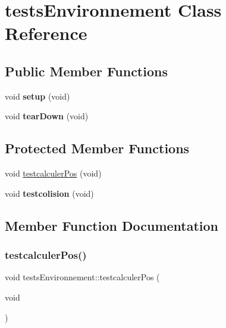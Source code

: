 \hypertarget{classtests_environnement}{}\section{tests\+Environnement Class Reference}
\label{classtests_environnement}
\subsection*{Public Member Functions}
\begin{DoxyCompactItemize}
\item 
\mbox{\label{classtests_environnement_abeba28862f0aec281c2fea8ea4a0b4ac}} 
void {\bfseries setup} (void)
\item 
\mbox{\label{classtests_environnement_a328c941f6a50c7dba5eb22fbd2c952c0}} 
void {\bfseries tear\+Down} (void)
\end{DoxyCompactItemize}
\subsection*{Protected Member Functions}
\begin{DoxyCompactItemize}
\item 
void \mbox{\hyperlink{classtests_environnement_ae79caa635d1b58cc453b921797649056}{testcalculer\+Pos}} (void)
\item 
\mbox{\label{classtests_environnement_a5d4b7e02dc219f13b240400476767b0d}} 
void {\bfseries testcolision} (void)
\end{DoxyCompactItemize}


\subsection{Member Function Documentation}
\mbox{\label{classtests_environnement_ae79caa635d1b58cc453b921797649056}} 
\subsubsection{\texorpdfstring{testcalculer\+Pos()}{testcalculerPos()}}
{\footnotesize\ttfamily void tests\+Environnement\+::testcalculer\+Pos (\begin{DoxyParamCaption}\item[{void}]{ }\end{DoxyParamCaption})\hspace{0.3cm}{\ttfamily [protected]}}

